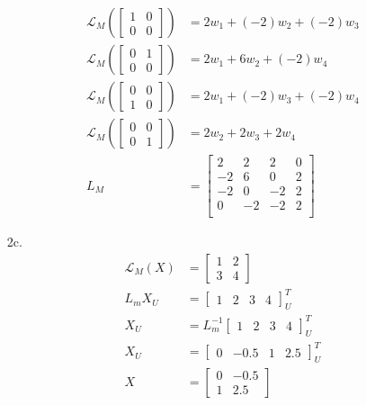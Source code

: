 \documentclass[12pt,fleqn,leqno,letterpaper]{article}
\begin{document}
\begin{enumerate}
					\begin{align*}
						\mathcal{L}_{M}\left(\begin{bmatrix} 1 & 0 \\ 0 & 0 \end{bmatrix}\right) &= 2 w_{1} + (-2) w_{2} + (-2) w_{3}\\
						\mathcal{L}_{M}\left(\begin{bmatrix} 0 & 1 \\ 0 & 0 \end{bmatrix}\right) &= 2 w_{1} + 6 w_{2} + (-2) w_{4}\\
						\mathcal{L}_{M}\left(\begin{bmatrix} 0 & 0 \\ 1 & 0 \end{bmatrix}\right) &= 2 w_{1} + (-2) w_{3} + (-2) w_{4}\\
						\mathcal{L}_{M}\left(\begin{bmatrix} 0 & 0 \\ 0 & 1 \end{bmatrix}\right) &= 2 w_{2} + 2 w_{3} + 2 w_{4}\\
						L_{M} &= \begin{bmatrix} 2 & 2 & 2 & 0 \\
																		-2 & 6 & 0 & 2\\
																		-2 & 0 & -2 & 2\\
																		0 & -2 & -2 & 2\\
										\end{bmatrix}
					\end{align*}
		\item[2c.]
					\begin{align*}
						\mathcal{L}_{M}(X) &= \begin{bmatrix} 1 & 2 \\ 3 & 4 \end{bmatrix}\\
						L_{m}X_{U} &= \begin{bmatrix} 1 & 2 & 3 & 4 \end{bmatrix}_{U}^{T}\\
						X_{U} &= L_{m}^{-1}\begin{bmatrix} 1 & 2 & 3 & 4 \end{bmatrix}_{U}^{T}\\
						X_{U} &= \begin{bmatrix} 0 & -0.5 & 1 & 2.5 \end{bmatrix}^{T}_{U}\\
						X &= \begin{bmatrix} 0 & -0.5 \\ 1 & 2.5 \end{bmatrix}

\end{align*}
\end{enumerate}
\end{document}
